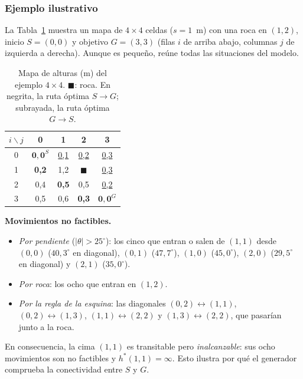 \subsubsection{Ejemplo ilustrativo}
\label{sec:ej3_ejemplo}

La Tabla~\ref{tab:ej3_mapa4x4} muestra un mapa de $4 \times 4$ celdas
($s = 1$~m) con una roca en $(1,2)$, inicio $S = (0,0)$ y objetivo
$G = (3,3)$ (filas $i$ de arriba abajo, columnas $j$ de izquierda a derecha).
Aunque es pequeño, reúne todas las situaciones del modelo.

\begin{table}[t]
  \centering
  \caption{Mapa de alturas (m) del ejemplo $4\times 4$. $\blacksquare$: roca.
  En negrita, la ruta óptima $S \to G$; subrayada, la ruta óptima $G \to S$.}
  \label{tab:ej3_mapa4x4}
  \footnotesize
  \begin{tabular}{@{}c|cccc@{}}
    $i \backslash j$ & 0 & 1 & 2 & 3 \\
    \hline
    0 & $\mathbf{0{,}0}^{S}$ & \underline{0,1} & \underline{0,2} & \underline{0,3} \\
    1 & \textbf{0,2} & 1,2 & $\blacksquare$ & \underline{0,3} \\
    2 & 0,4 & \textbf{0,5} & 0,5 & \underline{0,2} \\
    3 & 0,5 & 0,6 & \textbf{0,3} & $\mathbf{0{,}0}^{G}$ \\
  \end{tabular}
\end{table}

\textbf{Movimientos no factibles.}
\begin{itemize}
  \item \emph{Por pendiente} ($|\theta| > 25^\circ$): los cinco que entran o salen
  de $(1,1)$ desde $(0,0)$ ($40{,}3^\circ$ en diagonal), $(0,1)$
  ($47{,}7^\circ$), $(1,0)$ ($45{,}0^\circ$), $(2,0)$ ($29{,}5^\circ$ en diagonal) y
  $(2,1)$ ($35{,}0^\circ$).
  \item \emph{Por roca}: los ocho que entran en $(1,2)$.
  \item \emph{Por la regla de la esquina}: las diagonales $(0,2){\leftrightarrow}(1,1)$,
  $(0,2){\leftrightarrow}(1,3)$, $(1,1){\leftrightarrow}(2,2)$ y
  $(1,3){\leftrightarrow}(2,2)$, que pasarían junto a la roca.
\end{itemize}
En consecuencia, la cima $(1,1)$ es transitable pero \emph{inalcanzable}: sus
ocho movimientos son no factibles y $h^*(1,1) = \infty$. Esto ilustra por qué el
generador comprueba la conectividad entre $S$ y $G$.

